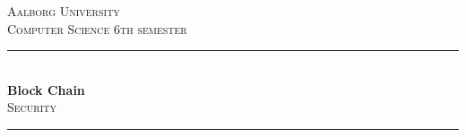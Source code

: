 %
\begin{titlepage}

\newcommand{\HRule}{\rule{\linewidth}{0.5mm}} %

\center %
\vspace*{2cm}

\textsc{\LARGE Aalborg University}\\[0.5cm] %
\textsc{\large Computer Science 6th semester}\\[1.0cm] %


\HRule \\[0.4cm]
{ \huge \bfseries Block Chain}\\[0.4cm] %
\textsc{\Large Security}\\[0.5cm]
\HRule \\[1.5cm]
 



\end{titlepage}
